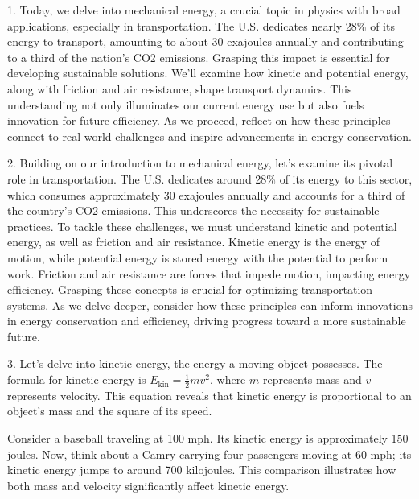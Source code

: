 \noindent
\textbf{}

\begin{tcolorbox}[size=title,opacityfill=0.05,breakable]
\noindent

1. Today, we delve into mechanical energy, a crucial topic in physics with broad applications, especially in transportation. The U.S. dedicates nearly 28\% of its energy to transport, amounting to about 30 exajoules annually and contributing to a third of the nation's CO2 emissions. Grasping this impact is essential for developing sustainable solutions. We'll examine how kinetic and potential energy, along with friction and air resistance, shape transport dynamics. This understanding not only illuminates our current energy use but also fuels innovation for future efficiency. As we proceed, reflect on how these principles connect to real-world challenges and inspire advancements in energy conservation.


2. Building on our introduction to mechanical energy, let's examine its pivotal role in transportation. The U.S. dedicates around 28\% of its energy to this sector, which consumes approximately 30 exajoules annually and accounts for a third of the country's CO2 emissions. This underscores the necessity for sustainable practices. To tackle these challenges, we must understand kinetic and potential energy, as well as friction and air resistance. Kinetic energy is the energy of motion, while potential energy is stored energy with the potential to perform work. Friction and air resistance are forces that impede motion, impacting energy efficiency. Grasping these concepts is crucial for optimizing transportation systems. As we delve deeper, consider how these principles can inform innovations in energy conservation and efficiency, driving progress toward a more sustainable future.


3. Let's delve into kinetic energy, the energy a moving object possesses. The formula for kinetic energy is \( E_{\text{kin}} = \frac{1}{2}mv^2 \), where \( m \) represents mass and \( v \) represents velocity. This equation reveals that kinetic energy is proportional to an object's mass and the square of its speed.

Consider a baseball traveling at 100 mph. Its kinetic energy is approximately 150 joules. Now, think about a Camry carrying four passengers moving at 60 mph; its kinetic energy jumps to around 700 kilojoules. This comparison illustrates how both mass and velocity significantly affect kinetic energy.


\end{tcolorbox}
